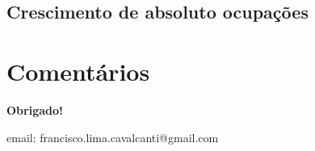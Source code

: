 \documentclass[8pt]{beamer}
\begin{document}
\subsection{Crescimento de absoluto ocupações}

\begin{frame}
\textit{\hyperlink{indice_principal_amz_metropolitana}{}}

\end{frame}

\begin{frame}
\textit{\hyperlink{indice_principal_amz_metropolitana}{}}

\end{frame}

\section{Comentários}

\frame
{
\begin{center}
	\vfill
	\textbf{Obrigado!}
	\\

	\begin{small}
	email: francisco.lima.cavalcanti@gmail.com
	\end{small}
	\vfill     
\end{center}
}
\end{document}
